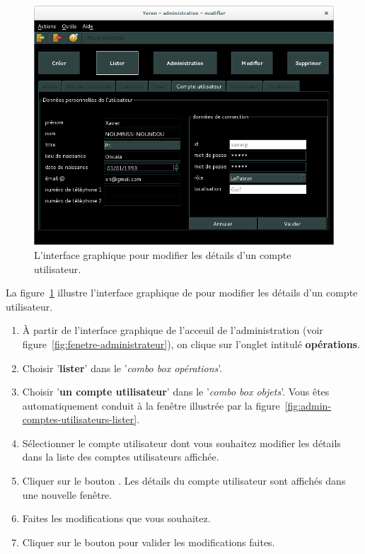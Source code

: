 \begin{figure}[!htpb]
	\centering
	\includegraphics[scale=0.45]{images/compte-utilisateur-modifier.png}
	\caption{L'interface graphique pour modifier les d\'etails
			d'un compte utilisateur.}
	\label{fig:admin-comptes-utilisateurs-modifier}
\end{figure}

La figure~\ref{fig:admin-comptes-utilisateurs-modifier} illustre
l'interface graphique de \yeren pour modifier les d\'etails
d'un compte utilisateur.

\begin{enumerate}[1)]
	\item \`A partir de l'interface graphique de l'acceuil de
		l'administration (voir figure~\ref{fig:fenetre-administrateur}),
		on clique sur l'onglet intitul\'e \textbf{op\'erations}. 
		
	\item Choisir '\textbf{lister}' dans le '\emph{combo box
		op\'erations}'.
		
	\item Choisir '\textbf{un compte utilisateur}' dans
		le '\emph{combo box objets}'. Vous \^etes automatiquement
		conduit \`a la fen\^etre illustr\'ee par la
		figure~\ref{fig:admin-comptes-utilisateurs-lister}.
		
	\item S\'electionner le compte utilisateur dont vous souhaitez
		modifier les d\'etails dans la liste des comptes
		utilisateurs affich\'ee.
		
	\item Cliquer sur le bouton . Les d\'etails
		du compte utilisateur sont affich\'es dans une nouvelle fen\^etre.
		
	\item Faites les modifications que vous souhaitez.
		
	\item Cliquer sur le bouton  pour valider
		les modifications faites.
\end{enumerate}

